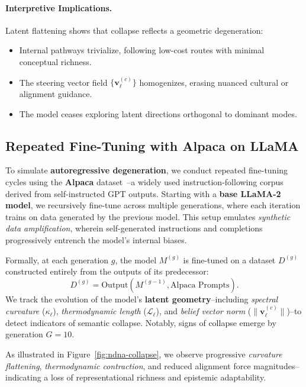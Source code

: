 \paragraph{Interpretive Implications.}
Latent flattening shows that collapse reflects a geometric degeneration:
\begin{itemize}[leftmargin=1.5em]
    \item Internal pathways trivialize, following low-cost routes with minimal conceptual richness.
    \item The steering vector field $\{\mathbf{v}_\ell^{(c)}\}$ homogenizes, erasing nuanced cultural or alignment guidance.
    \item The model ceases exploring latent directions orthogonal to dominant modes.
\end{itemize}




\subsection{Repeated Fine-Tuning with Alpaca on LLaMA}

To simulate \textbf{autoregressive degeneration}, we conduct repeated fine-tuning cycles using the \textbf{Alpaca} dataset~\cite{alpaca2023}--a widely used instruction-following corpus derived from self-instructed GPT outputs. Starting with a \textbf{base LLaMA-2 model}, we recursively fine-tune across multiple generations, where each iteration trains on data generated by the previous model. This setup emulates \emph{synthetic data amplification}, wherein self-generated instructions and completions progressively entrench the model’s internal biases.

\vspace{0.5em}
\noindent Formally, at each generation $g$, the model $M^{(g)}$ is fine-tuned on a dataset $D^{(g)}$ constructed entirely from the outputs of its predecessor:
\[
D^{(g)} = \text{Output}(M^{(g-1)}, \text{Alpaca Prompts}).
\]
\noindent We track the evolution of the model’s \textbf{latent geometry}--including \emph{spectral curvature} ($\kappa_\ell$), \emph{thermodynamic length} ($\mathcal{L}_\ell$), and \emph{belief vector norm} ($\| \mathbf{v}_\ell^{(c)} \|$)--to detect indicators of semantic collapse. Notably, signs of collapse emerge by generation $G = 10$.

\vspace{0.5em}
\noindent As illustrated in Figure~\ref{fig:ndna-collapse}, we observe progressive \textit{curvature flattening}, \textit{thermodynamic contraction}, and reduced alignment force magnitudes--indicating a loss of representational richness and epistemic adaptability.



